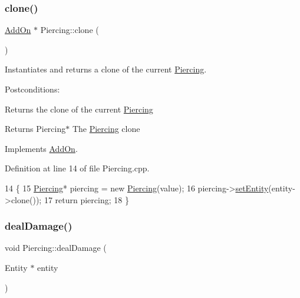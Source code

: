 \subsubsection{\texorpdfstring{clone()}{clone()}}
{\footnotesize\ttfamily \hyperlink{classAddOn}{Add\+On} $\ast$ Piercing\+::clone (\begin{DoxyParamCaption}{ }\end{DoxyParamCaption})\hspace{0.3cm}{\ttfamily [virtual]}}



Instantiates and returns a clone of the current \hyperlink{classPiercing}{Piercing}. 

Postconditions\+:
\begin{DoxyItemize}
\item Returns the clone of the current \hyperlink{classPiercing}{Piercing}
\end{DoxyItemize}

\begin{DoxyReturn}{Returns}
Piercing$\ast$ The \hyperlink{classPiercing}{Piercing} clone 
\end{DoxyReturn}


Implements \hyperlink{classAddOn_a5a090bf8b4e7260aa35d6f5b9d151955}{Add\+On}.



Definition at line 14 of file Piercing.\+cpp.


\begin{DoxyCode}
14                        \{
15     \hyperlink{classPiercing}{Piercing}* piercing = \textcolor{keyword}{new} \hyperlink{classPiercing_ad97c2ba97b49b1de3ac2d2c2253453fe}{Piercing}(value);
16     piercing->\hyperlink{classAddOn_ac9f4263e3558015fdad46adefceed197}{setEntity}(entity->clone());
17     \textcolor{keywordflow}{return} piercing;
18 \}
\end{DoxyCode}
\mbox{\label{classPiercing_a2dbd4a497f9abbebbbd2ceb2909f6163}} 
\subsubsection{\texorpdfstring{deal\+Damage()}{dealDamage()}}
{\footnotesize\ttfamily void Piercing\+::deal\+Damage (\begin{DoxyParamCaption}\item[{Entity $\ast$}]{entity }\end{DoxyParamCaption})\hspace{0.3cm}{\ttfamily [virtual]}}



